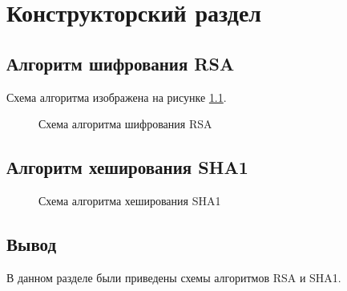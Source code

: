\chapter{Конструкторский раздел}
\label{cha:design}

\section{Алгоритм шифрования RSA}

Схема алгоритма изображена на рисунке \ref{fig:rsa}.

\begin{figure}[H]
	\caption{Схема алгоритма шифрования RSA}
	\label{fig:rsa}
\end{figure}

\section{Алгоритм хеширования SHA1}

\begin{figure}[H]
	\caption{Схема алгоритма хеширования SHA1}
	\label{fig:sha}
\end{figure}

\section*{Вывод}
В данном разделе были приведены схемы алгоритмов RSA и SHA1.


